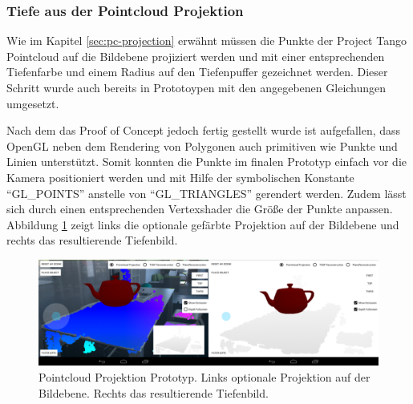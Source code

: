 \subsubsection*{Tiefe aus der Pointcloud Projektion}

Wie im Kapitel \ref{sec:pc-projection} erwähnt müssen die Punkte der Project Tango Pointcloud auf die Bildebene projiziert werden und mit einer entsprechenden Tiefenfarbe und einem Radius auf den Tiefenpuffer gezeichnet werden. Dieser Schritt wurde auch bereits in Prototoypen mit den angegebenen Gleichungen umgesetzt. 

Nach dem das Proof of Concept jedoch fertig gestellt wurde ist aufgefallen, dass OpenGL neben dem Rendering von Polygonen auch primitiven wie Punkte und Linien unterstützt. Somit konnten die Punkte im finalen Prototyp einfach vor die Kamera positioniert werden und mit Hilfe der symbolischen Konstante \enquote{GL\_POINTS} anstelle von \enquote{GL\_TRIANGLES} gerendert werden. Zudem lässt sich durch einen entsprechenden Vertexshader die Größe der Punkte anpassen. Abbildung \ref{fig:pc-demo} zeigt links die optionale gefärbte Projektion auf der Bildebene und rechts das resultierende Tiefenbild.

\begin{figure}[h]
  \centering
	\includegraphics[width=1.0\textwidth]{content/images/implementation/pc-demo.png} 
  \caption{Pointcloud Projektion Prototyp. Links optionale Projektion auf der Bildebene. Rechts das resultierende Tiefenbild.}
  \label{fig:pc-demo}
\end{figure}




